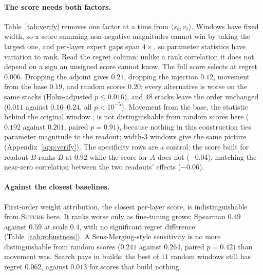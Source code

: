 \documentclass{article}
\theoremstyle{plain}
\theoremstyle{definition}
\theoremstyle{remark}
\begin{document}
\paragraph{The score needs both factors.} Table~\ref{tab:verify} removes one factor at a
time from $\langle s_\ell, v_\ell\rangle$. Windows have fixed width, so a score
summing non-negative magnitudes cannot win by taking the largest one, and
per-layer expert gaps span $4\times$, so parameter statistics have variation to
rank. Read the regret column: unlike a rank correlation it does not depend on a
sign an unsigned score cannot know. The full
score selects at regret $0.006$. Dropping the adjoint gives $0.21$, dropping the
injection $0.12$, movement from the base $0.19$, and random scores $0.20$; every
alternative is worse on the same stacks (Holm-adjusted $p\le0.016$), and $48$
stacks leave the order unchanged ($0.011$ against $0.16$--$0.24$, all
$p<10^{-5}$). Movement from the base, the statistic behind the original window
\citep{bandarkar2025layerswap}, is not distinguishable from random scores here
($0.192$ against $0.201$, paired $p=0.91$), because nothing in this construction
ties parameter magnitude to the readout; width-3 windows give the same picture
(Appendix~\ref{app:verify}). The specificity rows are a control:
the score built for readout $B$ ranks $B$ at $0.92$ while the score for $A$ does
not ($-0.04$), matching the near-zero correlation between the two readouts'
effects ($-0.06$).

\paragraph{Against the closest baselines.}
First-order weight attribution, the closest per-layer score, is indistinguishable
from \textsc{Suture} here. It ranks worse only as fine-tuning grows: Spearman
$0.49$ against $0.59$ at scale $0.4$, with no significant regret difference
(Table~\ref{tab:robustness}). A Sens-Merging-style sensitivity
\citep{liu2025sensmerging} is no more distinguishable from random scores
($0.241$ against $0.264$, paired $p=0.42$) than movement was. Search pays in
builds: the best of $11$ random windows still has regret $0.062$, against
$0.013$ for scores that build nothing.
\end{document}
